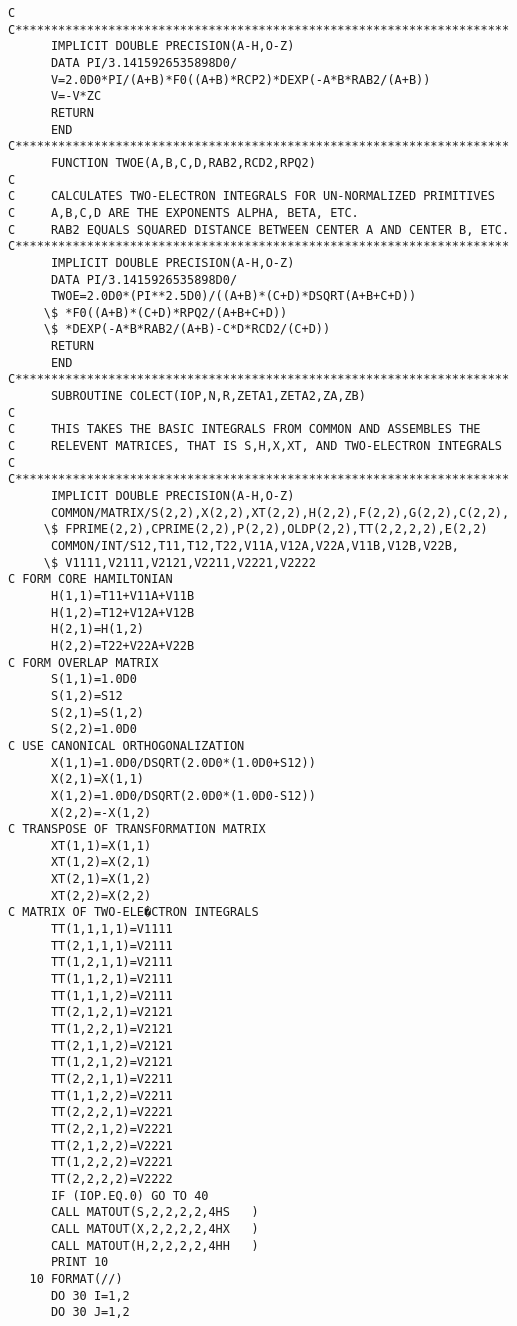 \begin{verbatim}
C
C*********************************************************************
      IMPLICIT DOUBLE PRECISION(A-H,O-Z)
      DATA PI/3.1415926535898D0/
      V=2.0D0*PI/(A+B)*F0((A+B)*RCP2)*DEXP(-A*B*RAB2/(A+B))
      V=-V*ZC
      RETURN
      END
C*********************************************************************
      FUNCTION TWOE(A,B,C,D,RAB2,RCD2,RPQ2)
C
C     CALCULATES TWO-ELECTRON INTEGRALS FOR UN-NORMALIZED PRIMITIVES
C     A,B,C,D ARE THE EXPONENTS ALPHA, BETA, ETC.
C     RAB2 EQUALS SQUARED DISTANCE BETWEEN CENTER A AND CENTER B, ETC.
C*********************************************************************
      IMPLICIT DOUBLE PRECISION(A-H,O-Z)
      DATA PI/3.1415926535898D0/
      TWOE=2.0D0*(PI**2.5D0)/((A+B)*(C+D)*DSQRT(A+B+C+D))
     \$ *F0((A+B)*(C+D)*RPQ2/(A+B+C+D))
     \$ *DEXP(-A*B*RAB2/(A+B)-C*D*RCD2/(C+D))
      RETURN
      END
C*********************************************************************
      SUBROUTINE COLECT(IOP,N,R,ZETA1,ZETA2,ZA,ZB)
C
C     THIS TAKES THE BASIC INTEGRALS FROM COMMON AND ASSEMBLES THE
C     RELEVENT MATRICES, THAT IS S,H,X,XT, AND TWO-ELECTRON INTEGRALS
C
C*********************************************************************
      IMPLICIT DOUBLE PRECISION(A-H,O-Z)
      COMMON/MATRIX/S(2,2),X(2,2),XT(2,2),H(2,2),F(2,2),G(2,2),C(2,2),
     \$ FPRIME(2,2),CPRIME(2,2),P(2,2),OLDP(2,2),TT(2,2,2,2),E(2,2)
      COMMON/INT/S12,T11,T12,T22,V11A,V12A,V22A,V11B,V12B,V22B,
     \$ V1111,V2111,V2121,V2211,V2221,V2222
C FORM CORE HAMILTONIAN
      H(1,1)=T11+V11A+V11B
      H(1,2)=T12+V12A+V12B
      H(2,1)=H(1,2)
      H(2,2)=T22+V22A+V22B
C FORM OVERLAP MATRIX
      S(1,1)=1.0D0
      S(1,2)=S12
      S(2,1)=S(1,2)
      S(2,2)=1.0D0
C USE CANONICAL ORTHOGONALIZATION
      X(1,1)=1.0D0/DSQRT(2.0D0*(1.0D0+S12))
      X(2,1)=X(1,1)
      X(1,2)=1.0D0/DSQRT(2.0D0*(1.0D0-S12))
      X(2,2)=-X(1,2)
C TRANSPOSE OF TRANSFORMATION MATRIX
      XT(1,1)=X(1,1)
      XT(1,2)=X(2,1)
      XT(2,1)=X(1,2)
      XT(2,2)=X(2,2)
C MATRIX OF TWO-ELE�CTRON INTEGRALS
      TT(1,1,1,1)=V1111
      TT(2,1,1,1)=V2111
      TT(1,2,1,1)=V2111
      TT(1,1,2,1)=V2111
      TT(1,1,1,2)=V2111
      TT(2,1,2,1)=V2121
      TT(1,2,2,1)=V2121
      TT(2,1,1,2)=V2121
      TT(1,2,1,2)=V2121
      TT(2,2,1,1)=V2211
      TT(1,1,2,2)=V2211
      TT(2,2,2,1)=V2221
      TT(2,2,1,2)=V2221
      TT(2,1,2,2)=V2221
      TT(1,2,2,2)=V2221
      TT(2,2,2,2)=V2222
      IF (IOP.EQ.0) GO TO 40
      CALL MATOUT(S,2,2,2,2,4HS   )
      CALL MATOUT(X,2,2,2,2,4HX   )
      CALL MATOUT(H,2,2,2,2,4HH   )
      PRINT 10
   10 FORMAT(//)
      DO 30 I=1,2
      DO 30 J=1,2

\end{verbatim}
